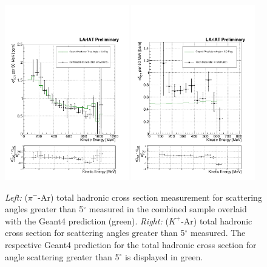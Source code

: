 \begin{figure}[htb]
\centering
\includegraphics[width=0.48\textwidth]{Chapter-6/Images/TheRealMoneyPlot.pdf}
\includegraphics[width=0.48\textwidth]{Chapter-7/Images/TheMoneyPlotK.pdf}
\caption{\emph{Left:} ($\pi^-$-Ar) total hadronic cross section measurement for  scattering angles greater than 5$^\circ$ measured in the combined sample overlaid with the  Geant4 prediction (green). \emph{Right:} ($K^+$-Ar) total hadronic cross section for  scattering angles greater than 5$^\circ$ measured. The respective Geant4 prediction for the total hadronic cross section for angle scattering greater than 5$^\circ$ is displayed in green. } 
\label{fig:finalfinal}
\end{figure}



